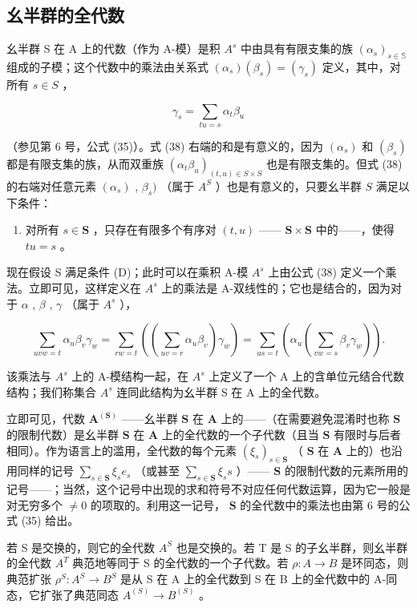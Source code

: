 \subsection{幺半群的全代数}

幺半群 S 在 A 上的代数（作为 A-模）是积 \(A^{s}\) 中由具有有限支集的族 \((\alpha_{s})_{s\in\mathbb{S}}\) 组成的子模；这个代数中的乘法由关系式 \((\alpha_{s})(\beta_{s})=(\gamma_{s})\) 定义，其中，对所有 \(s\in S\) ，

\[
\gamma_ {s} = \sum_ {t u = s} \alpha_ {t} \beta_ {u}\tag{38}
\]

（参见第 6 号，公式 (35)）。式 (38) 右端的和是有意义的，因为 \((\alpha_{s})\) 和 \((\beta_{s})\) 都是有限支集的族，从而双重族 \((\alpha_{t}\beta_{u})_{(t,u)\in S\times S}\) 也是有限支集的。但式 (38) 的右端对任意元素 \((\alpha_{s})\) , \(\beta_{s})\) （属于 \(A^{S}\) ）也是有意义的，只要幺半群 \(S\) 满足以下条件：

\begin{enumerate}
\def\labelenumi{(\Alph{enumi})}
\setcounter{enumi}{3}
\tightlist
\item
  对所有 \(s \in \mathbf{S}\) ，只存在有限多个有序对 \((t, u)\) —— \(\mathbf{S} \times \mathbf{S}\) 中的——，使得 \(tu = s\) 。
\end{enumerate}

现在假设 S 满足条件 (D)；此时可以在乘积 A-模 \(A^{s}\) 上由公式 (38) 定义一个乘法。立即可见，这样定义在 \(A^{s}\) 上的乘法是 A-双线性的；它也是结合的，因为对于 \(\alpha\) , \(\beta\) , \(\gamma\) （属于 \(A^{s}\) ），

\[
\sum_ {u v w = t} \alpha_ {u} \beta_ {v} \gamma_ {w} = \sum_ {r w = t} \left(\left(\sum_ {u v = r} \alpha_ {u} \beta_ {v}\right) \gamma_ {w}\right) = \sum_ {u s = t} \left(\alpha_ {u} \left(\sum_ {v w = s} \beta_ {v} \gamma_ {w}\right)\right).
\]

该乘法与 \(A^{s}\) 上的 A-模结构一起，在 \(A^{s}\) 上定义了一个 A 上的含单位元结合代数结构；我们称集合 \(A^{s}\) 连同此结构为幺半群 S 在 A 上的全代数。

立即可见，代数 \(\mathbf{A}^{(\mathbf{S})}\) ——幺半群 \(\mathbf{S}\) 在 \(\mathbf{A}\) 上的——（在需要避免混淆时也称 \(\mathbf{S}\) 的限制代数）是幺半群 \(\mathbf{S}\) 在 \(\mathbf{A}\) 上的全代数的一个子代数（且当 \(\mathbf{S}\) 有限时与后者相同）。作为语言上的滥用，全代数的每个元素 \((\xi_s)_{s \in \mathbf{S}}\) （ \(\mathbf{S}\) 在 \(\mathbf{A}\) 上的）也沿用同样的记号 \(\sum_{s \in \mathbf{S}} \xi_s e_s\) （或甚至 \(\sum_{s \in \mathbf{S}} \xi_s s\) ）—— \(\mathbf{S}\) 的限制代数的元素所用的记号——；当然，这个记号中出现的求和符号不对应任何代数运算，因为它一般是对无穷多个 \(\neq 0\) 的项取的。利用这一记号， \(\mathbf{S}\) 的全代数中的乘法也由第 6 号的公式 (35) 给出。

若 S 是交换的，则它的全代数 \(A^{S}\) 也是交换的。若 T 是 S 的子幺半群，则幺半群的全代数 \(A^{T}\) 典范地等同于 S 的全代数的一个子代数。若 \(\rho: A \to B\) 是环同态，则典范扩张 \(\rho^{S}: A^{S} \to B^{S}\) 是从 S 在 A 上的全代数到 S 在 B 上的全代数中的 A-同态，它扩张了典范同态 \(A^{(S)} \to B^{(S)}\) 。
\relax{}
